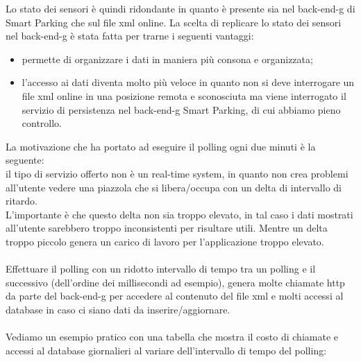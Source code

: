 Lo stato dei sensori è quindi ridondante in quanto è presente sia nel \gls{back-end-g} di Smart Parking che sul file \gls{xml} online. 
La scelta di replicare lo stato dei sensori nel \gls{back-end-g} è stata fatta per trarne i seguenti vantaggi:
\begin{itemize}
    \item permette di organizzare i dati in maniera più consona e organizzata;
    \item l'accesso ai dati diventa molto più veloce in quanto non si deve interrogare un file \gls{xml} online
        in una posizione remota e sconosciuta ma viene interrogato il servizio di persistenza nel \gls{back-end-g} Smart Parking, 
        di cui abbiamo pieno controllo.
\end{itemize}
\leavevmode\newline
La motivazione che ha portato ad eseguire il polling ogni due minuti è la seguente:
\\
il tipo di servizio offerto non è un real-time system, in quanto non crea problemi all'utente
vedere una piazzola che si libera/occupa con un delta di intervallo di ritardo. 
\\
L'importante è che questo delta non sia troppo elevato, in tal caso i dati mostrati all'utente sarebbero troppo
inconsistenti per risultare utili. Mentre un delta troppo piccolo genera un carico di lavoro per l'applicazione troppo
elevato.
\\\\
Effettuare il polling con un ridotto intervallo di tempo tra un polling e il successivo (dell'ordine dei millisecondi
ad esempio),
genera molte 
chiamate \gls{http} da parte del \gls{back-end-g} per accedere al contenuto del file \gls{xml} e molti accessi al database in caso ci siano dati da 
inserire/aggiornare.
\\\\
Vediamo un esempio pratico con una tabella che mostra il costo di chiamate e accessi al database giornalieri al variare 
dell'intervallo di tempo del polling:

